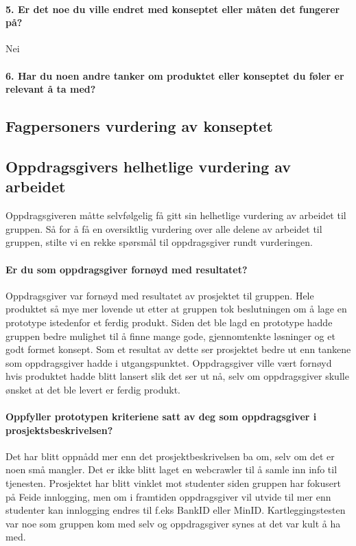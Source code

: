 \paragraph{5. Er det noe du ville endret med konseptet eller måten det fungerer på?}

Nei

\paragraph{6. Har du noen andre tanker om produktet eller konseptet du føler er relevant å ta med?}


\subsection{Fagpersoners vurdering av konseptet}


\subsection{Oppdragsgivers helhetlige vurdering av arbeidet}
Oppdragsgiveren måtte selvfølgelig få gitt sin helhetlige vurdering av arbeidet til gruppen. Så for å få en oversiktlig vurdering over alle delene av arbeidet til gruppen, stilte vi en rekke spørsmål til oppdragsgiver rundt vurderingen. 

\paragraph{Er du som oppdragsgiver fornøyd med resultatet?}
Oppdragsgiver var fornøyd med resultatet av prosjektet til gruppen. Hele produktet så mye mer lovende ut etter at gruppen tok beslutningen om å lage en prototype istedenfor et ferdig produkt. Siden det ble lagd en prototype hadde gruppen bedre mulighet til å finne mange gode, gjennomtenkte løsninger og et godt formet konsept. Som et resultat av dette ser prosjektet bedre ut enn tankene som oppdragsgiver hadde i utgangspunktet. Oppdragsgiver ville vært fornøyd hvis produktet hadde blitt lansert slik det ser ut nå, selv om oppdragsgiver skulle ønsket at det ble levert er ferdig produkt.

\paragraph{Oppfyller prototypen kriteriene satt av deg som oppdragsgiver i prosjektsbeskrivelsen?}
Det har blitt oppnådd mer enn det prosjektbeskrivelsen ba om, selv om det er noen små mangler. Det er ikke blitt laget en webcrawler til å samle inn info til tjenesten. Prosjektet har blitt vinklet mot studenter siden gruppen har fokusert på Feide innlogging, men om i framtiden oppdragsgiver vil utvide til mer enn studenter kan innlogging endres til f.eks BankID eller MinID. Kartleggingstesten var noe som gruppen kom med selv og oppdragsgiver synes at det var kult å ha med. 

